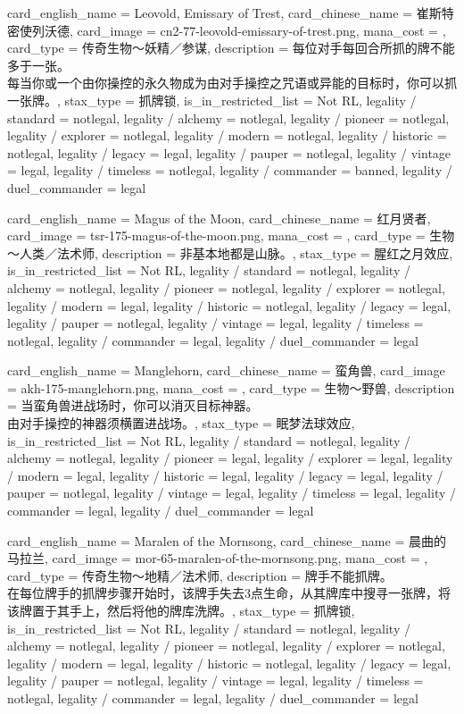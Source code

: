 \documentclass[lang = cn, color = black, 10pt]{AllThatStax}
\begin{document}
\card
{
	card_english_name = {Leovold, Emissary of Trest},
	card_chinese_name = {崔斯特密使列沃德},
	card_image = cn2-77-leovold-emissary-of-trest.png,
	mana_cost = ,
	card_type = 传奇生物～妖精／参谋,
	description = {每位对手每回合所抓的牌不能多于一张。\\
		每当你或一个由你操控的永久物成为由对手操控之咒语或异能的目标时，你可以抓一张牌。},
	stax_type = 抓牌锁,
	is_in_restricted_list = Not RL,
	legality / standard = notlegal,
	legality / alchemy = notlegal,
	legality / pioneer = notlegal,
	legality / explorer = notlegal,
	legality / modern = notlegal,
	legality / historic = notlegal,
	legality / legacy = legal,
	legality / pauper = notlegal,
	legality / vintage = legal,
	legality / timeless = notlegal,
	legality / commander = banned,
	legality / duel_commander = legal
}

\card
{
	card_english_name = {Magus of the Moon},
	card_chinese_name = {红月贤者},
	card_image = tsr-175-magus-of-the-moon.png,
	mana_cost = ,
	card_type = 生物 ～人类／法术师,
	description = {非基本地都是山脉。},
	stax_type = 腥红之月效应,
	is_in_restricted_list = Not RL,
	legality / standard = notlegal,
	legality / alchemy = notlegal,
	legality / pioneer = notlegal,
	legality / explorer = notlegal,
	legality / modern = legal,
	legality / historic = notlegal,
	legality / legacy = legal,
	legality / pauper = notlegal,
	legality / vintage = legal,
	legality / timeless = notlegal,
	legality / commander = legal,
	legality / duel_commander = legal
}

\card
{
	card_english_name = {Manglehorn},
	card_chinese_name = {蛮角兽},
	card_image = akh-175-manglehorn.png,
	mana_cost = ,
	card_type = 生物～野兽,
	description = {当蛮角兽进战场时，你可以消灭目标神器。\\
		由对手操控的神器须横置进战场。},
	stax_type = 眠梦法球效应,
	is_in_restricted_list = Not RL,
	legality / standard = notlegal,
	legality / alchemy = notlegal,
	legality / pioneer = legal,
	legality / explorer = legal,
	legality / modern = legal,
	legality / historic = legal,
	legality / legacy = legal,
	legality / pauper = notlegal,
	legality / vintage = legal,
	legality / timeless = legal,
	legality / commander = legal,
	legality / duel_commander = legal
}

\card
{
	card_english_name = {Maralen of the Mornsong},
	card_chinese_name = {晨曲的马拉兰},
	card_image = mor-65-maralen-of-the-mornsong.png,
	mana_cost = ,
	card_type = 传奇生物～地精／法术师,
	description = {牌手不能抓牌。\\
		在每位牌手的抓牌步骤开始时，该牌手失去3点生命，从其牌库中搜寻一张牌，将该牌置于其手上，然后将他的牌库洗牌。},
	stax_type = 抓牌锁,
	is_in_restricted_list = Not RL,
	legality / standard = notlegal,
	legality / alchemy = notlegal,
	legality / pioneer = notlegal,
	legality / explorer = notlegal,
	legality / modern = legal,
	legality / historic = notlegal,
	legality / legacy = legal,
	legality / pauper = notlegal,
	legality / vintage = legal,
	legality / timeless = notlegal,
	legality / commander = legal,
	legality / duel_commander = legal
}
\end{document}
